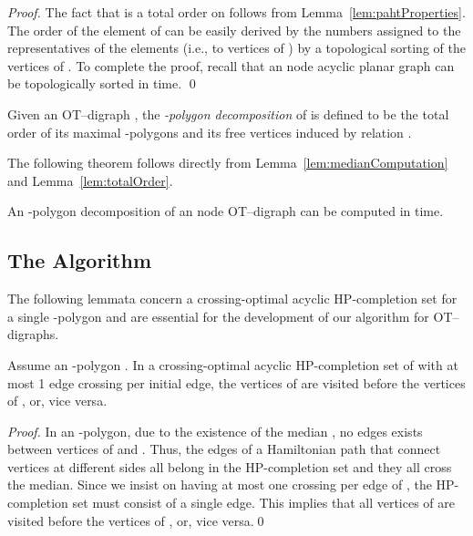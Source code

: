 \documentclass{myllncs-mixalis}
\newcommand{\eat}[1] {{}}
\begin{document}
\begin{proof}
The fact that  is a total order on 
 follows from Lemma~\ref{lem:pahtProperties}. The  order of
 the element of  can be easily derived by the
 numbers assigned to the representatives of the elements (i.e., to
 vertices of ) by a topological sorting of the vertices of .
 To complete the proof, recall that an  node acyclic planar graph can be
 topologically sorted in  time.
\qed
\end{proof}

\begin{definition}
Given an OT--digraph ,  the \emph{-polygon decomposition}
 of  is defined to be the total order of its
maximal -polygons and its free vertices induced by relation
.
\end{definition}

The following theorem follows directly from
Lemma~\ref{lem:medianComputation} and Lemma~\ref{lem:totalOrder}.

\begin{theorem}
\label{thm:STpolygonDecomposition} An -polygon decomposition of
an  node OT--digraph  can be computed in  time.
\end{theorem}

\subsection{The Algorithm}

The following lemmata concern a crossing-optimal acyclic
HP-completion set for a single -polygon and are essential for
the development of our   algorithm for OT--digraphs.

\eat{ Let  be an -polygon 
where  and  are the vertices to its left and right border,
respectively.
 }

\begin{lemma}
\label{lem:NoMixedSidesBook} Assume an -polygon . In a crossing-optimal acyclic HP-completion set
of  with at most 1 edge crossing per initial edge,  the vertices
of
   are visited before the vertices of , or, vice
  versa.
\end{lemma}

\begin{proof}
In an -polygon, due to the existence of the median , no
edges exists between vertices of  and . Thus, the edges of
a Hamiltonian path that connect vertices at different sides all
belong in the HP-completion set and they all cross the median. Since
we insist on having at most one crossing per edge of , the
HP-completion set must consist of a single edge. This implies that
all vertices of  are visited before the vertices of , or,
vice versa.\qed
\end{proof}
\end{document}

